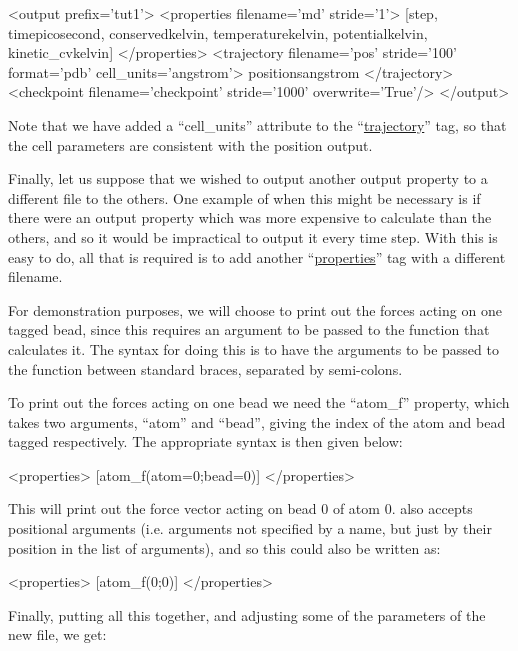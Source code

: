 \documentclass[11pt,english,fleqn]{report}
\newenvironment{code}{%
\footnotesize
\verbatim
}{
\endverbatim
\normalsize
}
\begin{document}
\begin{code}
<output prefix='tut1'>
   <properties filename='md' stride='1'>
      [step, time{picosecond}, conserved{kelvin},
       temperature{kelvin}, potential{kelvin}, kinetic_cv{kelvin}]
   </properties>
   <trajectory filename='pos' stride='100' format='pdb' cell_units='angstrom'>
      positions{angstrom}
   </trajectory>
   <checkpoint filename='checkpoint' stride='1000' overwrite='True'/>
</output>
\end{code}

Note that we have added a {}``cell\_units'' attribute
to the {}``\hyperref[TRAJECTORY]{trajectory}'' tag, so that the
cell parameters are consistent with the position output.

Finally, let us suppose that we wished to output another output property
to a different file to the others. One example of when this
might be necessary is if there
were an output property which was more expensive to calculate than the
others, and so it would be impractical to output it every time step.
With \ipi this is easy to do, all that is required is to add another
{}``\hyperref[PROPERTIES]{properties}'' tag with a different filename.

For demonstration purposes, we will choose to print out the forces
acting on one tagged bead, since this requires an argument to be
passed to the function that calculates it. The \ipi syntax for doing this is to have
the arguments to be passed to the function between standard braces,
separated by semi-colons.

To print out the forces acting on one bead we need the {}``atom\_f''
property, which takes two arguments, {}``atom'' and {}``bead'',
giving the index of the atom and bead tagged respectively. The
appropriate syntax is then given below:

\begin{code}
<properties>
   [atom_f(atom=0;bead=0)]
</properties>
\end{code}

This will print out the force vector acting on bead 0 of atom 0.
\ipi also accepts positional arguments
(i.e. arguments not specified by a name, but just by their position
in the list of arguments), and so this could also be written as:

\begin{code}
<properties>
   [atom_f(0;0)]
</properties>
\end{code}

Finally, putting all this together, and adjusting some
of the parameters of the new file, we get:
\end{document}
